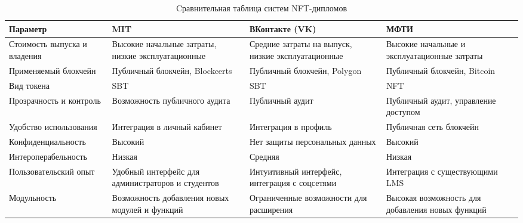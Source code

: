 \begin{table}[H]
    \caption{Cравнительная таблица систем NFT-дипломов}
    \centering

    \emergencystretch=10pt
    \begin{tabular}{|x{4cm}|x{3.2cm}|x{3.2cm}|x{3.2cm}|}
        \hline
        \textbf{Параметр} & \textbf{MIT} & \textbf{ВКонтакте (VK)} & \textbf{МФТИ} \\ \hline
        Стоимость выпуска и владения & Высокие начальные затраты, низкие эксплуатационные & Средние затраты на выпуск, низкие эксплуатационные & Высокие начальные и эксплуатационные затраты \\ \hline
        Применяемый блокчейн & Публичный блокчейн, Blockcerts & Публичный блокчейн, Polygon & Публичный блокчейн, Bitcoin \\ \hline
        Вид токена & SBT & SBT & NFT \\ \hline
        Прозрачность и контроль & Возможность публичного аудита & Публичный аудит & Публичный аудит, управление доступом \\ \hline
        Удобство использования & Интеграция в личный кабинет & Интеграция в профиль & Публичная сеть блокчейн \\ \hline
        Конфиденциальность & Высокий & Нет защиты персональных данных & Высокий \\ \hline
        Интероперабельность & Низкая & Средняя & Низкая \\ \hline
        Пользовательский опыт & Удобный интерфейс для администраторов и студентов & Интуитивный интерфейс, интеграция с соцсетями & Интеграция с существующими LMS \\ \hline
        Модульность & Возможность добавления новых модулей и функций & Ограниченные возможности для расширения & Высокая возможность для добавления новых функций \\ \hline
    \end{tabular}
    \label{tab:nft_diplomas_comparison}
\end{table}

